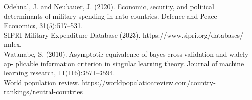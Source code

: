 \documentclass[12pt,a4paper]{article}
\begin{document}
Odehnal, J. and Neubauer, J. (2020). Economic, security, and political determinants of military spending in nato countries. Defence and Peace Economics, 31(5):517–531. \\

SIPRI Military Expenditure Database (2023). https://www.sipri.org/databases/ milex. \\

Watanabe, S. (2010). Asymptotic equivalence of bayes cross validation and widely ap- plicable information criterion in singular learning theory. Journal of machine learning research, 11(116):3571–3594. \\

World population review, https://worldpopulationreview.com/country-rankings/neutral-countries \\
\end{document}
